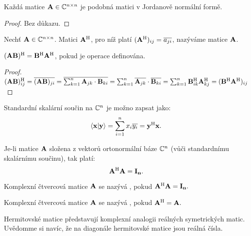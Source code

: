 \begin{theorem}
    Každá matice $\mathbf{A} \in \mathbb{C}^{n\times n}$ je podobná matici v Jordanově normální formě.
\end{theorem}

\begin{proof}
    Bez důkazu.
\end{proof}

\begin{definition}
    Nechť $\mathbf{A} \in \mathbb{C}^{n\times n}$. Matici $\mathbf{A}^{\mathrm{H}}$, pro níž platí $(\mathbf{A}^{\mathrm{H}})_{ij} = 
    \overline{a_{ji}}$, nazýváme  matice 
    $\mathbf{A}$.
\end{definition}

\begin{observation}
    $(\mathbf{A}\mathbf{B})^{\mathrm{H}} = \mathbf{B}^{\mathrm{H}} \mathbf{A}^{\mathrm{H}}$, pokud je operace definována.
\end{observation}

\begin{proof}
    $(\mathbf{A}\mathbf{B})^{\mathrm{H}}_{ij} = \overline{(\mathbf{A}\mathbf{B})_{ji}} = \overline{\sum_{k=1}^n 
    \mathbf{A}_{jk} \cdot \mathbf{B}_{ki}} = \sum_{k=1}^n \overline{\mathbf{A}_{jk}} \cdot \overline{\mathbf{B}_{ki}} = 
    \sum_{k=1}^n \mathbf{B}^{\mathrm{H}}_{ik} \mathbf{A}^{\mathrm{H}}_{kj} = (\mathbf{B}^{\mathrm{H}} \mathbf{A}^{\mathrm{H}})_{ij}$
\end{proof}

\begin{observation}
    Standardní skalární součin na $\mathbb{C}^n$ je možno zapsat jako:
    $$\langle \mathbf{x} | \mathbf{y} \rangle = \sum_{i=1}^n x_i \overline{y_i} = \mathbf{y}^{\mathrm{H}} \mathbf{x}.$$
\end{observation}

\begin{observation}
    Je-li matice $\mathbf{A}$ složena z vektorů ortonormální báze $\mathbb{C}^n$ (vůči
    standardnímu skalárnímu součinu), tak platí: $$\mathbf{A}^{\mathrm{H}} \mathbf{A} = \mathbf{I_{n}}.$$
\end{observation}

\begin{definition}
    Komplexní čtvercová matice $\mathbf{A}$ se nazývá , pokud
    $\mathbf{A}^{\mathrm{H}} \mathbf{A} = \mathbf{I_{n}}.$
\end{definition}

\begin{definition}
    Komplexní čtvercová matice $\mathbf{A}$ se nazývá , 
    pokud $\mathbf{A}^{\mathrm{H}} = \mathbf{A}.$
\end{definition}

\begin{remark}
    Hermitovské matice představují komplexní analogii reálných 
    symetrických matic. Uvědomme si navíc, že na diagonále hermitovské matice 
    jsou reálná čísla. 
\end{remark}

